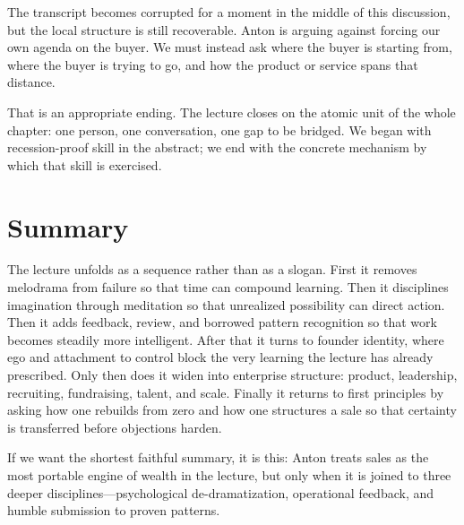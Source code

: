 The transcript becomes corrupted for a moment in the middle of this discussion, but the local structure is still recoverable. Anton is arguing against forcing our own agenda on the buyer. We must instead ask where the buyer is starting from, where the buyer is trying to go, and how the product or service spans that distance.

That is an appropriate ending. The lecture closes on the atomic unit of the whole chapter: one person, one conversation, one gap to be bridged. We began with recession-proof skill in the abstract; we end with the concrete mechanism by which that skill is exercised.

\section{Summary}

The lecture unfolds as a sequence rather than as a slogan. First it removes melodrama from failure so that time can compound learning. Then it disciplines imagination through meditation so that unrealized possibility can direct action. Then it adds feedback, review, and borrowed pattern recognition so that work becomes steadily more intelligent. After that it turns to founder identity, where ego and attachment to control block the very learning the lecture has already prescribed. Only then does it widen into enterprise structure: product, leadership, recruiting, fundraising, talent, and scale. Finally it returns to first principles by asking how one rebuilds from zero and how one structures a sale so that certainty is transferred before objections harden.

If we want the shortest faithful summary, it is this: Anton treats sales as the most portable engine of wealth in the lecture, but only when it is joined to three deeper disciplines---psychological de-dramatization, operational feedback, and humble submission to proven patterns.